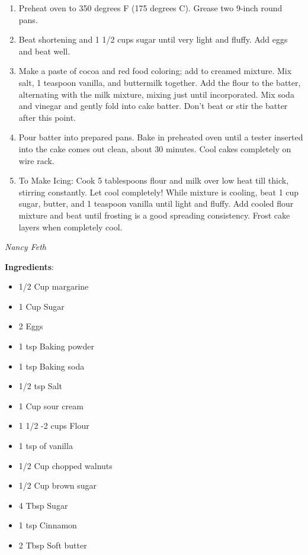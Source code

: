 \documentclass[11pt, twoside, openany]{book}
\begin{document}
\vspace{-3mm}\begin{enumerate}\setlength\itemsep{-1mm}
\item Preheat oven to 350 degrees F (175 degrees C). Grease two 9-inch round pans.
\item Beat shortening and 1 1/2 cups sugar until very light and fluffy. Add eggs and beat well.
\item Make a paste of cocoa and red food coloring; add to creamed mixture. Mix salt, 1 teaspoon vanilla, and buttermilk together. Add the flour to the batter, alternating with the milk mixture, mixing just until incorporated. Mix soda and vinegar and gently fold into cake batter. Don't beat or stir the batter after this point.
\item Pour batter into prepared pans. Bake in preheated oven until a tester inserted into the cake comes out clean, about 30 minutes. Cool cakes completely on wire rack.
\item To Make Icing: Cook 5 tablespoons flour and milk over low heat till thick, stirring constantly. Let cool completely! While mixture is cooling, beat 1 cup sugar, butter, and 1 teaspoon vanilla until light and fluffy. Add cooled flour mixture and beat until frosting is a good spreading consistency. Frost cake layers when completely cool.
\end{enumerate}
 \label{sour-cream-coffee-cake}\hfill\textit{Nancy Feth}\\
\begin{minipage}[t]{0.8\linewidth}
\textbf{Ingredients}:\vspace{-3mm}
\begin{multicols}{2}
\begin{itemize}\setlength\itemsep{-1mm}
\item 1/2 Cup margarine
\item 1 Cup Sugar
\item 2 Eggs
\item 1 tsp Baking powder
\item 1 tsp Baking soda
\item 1/2 tsp Salt
\item 1 Cup sour cream
\item 1 1/2 -2 cups Flour
\item 1 tsp of vanilla
\item 1/2 Cup chopped walnuts
\item 1/2 Cup brown sugar
\item 4 Tbsp Sugar
\item 1 tsp Cinnamon
\item 2 Tbsp Soft butter
\end{itemize}
\end{multicols}
\end{minipage}
\end{document}
